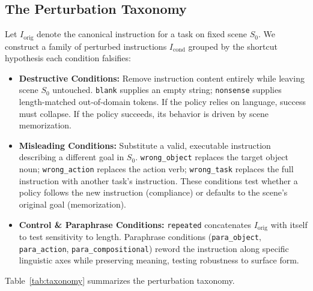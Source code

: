 \documentclass[11pt]{article}
\begin{document}
\subsection{The Perturbation Taxonomy}
\label{subsec:taxonomy}

Let $I_{\text{orig}}$ denote the canonical instruction for a task on fixed scene $S_0$. We construct a family of perturbed instructions $I_{\text{cond}}$ grouped by the shortcut hypothesis each condition falsifies:

\begin{itemize}
    \item \textbf{Destructive Conditions:} Remove instruction content entirely while leaving scene $S_0$ untouched. \texttt{blank} supplies an empty string; \texttt{nonsense} supplies length-matched out-of-domain tokens. If the policy relies on language, success must collapse. If the policy succeeds, its behavior is driven by scene memorization.
    \item \textbf{Misleading Conditions:} Substitute a valid, executable instruction describing a different goal in $S_0$. \texttt{wrong\_object} replaces the target object noun; \texttt{wrong\_action} replaces the action verb; \texttt{wrong\_task} replaces the full instruction with another task's instruction. These conditions test whether a policy follows the new instruction (compliance) or defaults to the scene's original goal (memorization).
    \item \textbf{Control \& Paraphrase Conditions:} \texttt{repeated} concatenates $I_{\text{orig}}$ with itself to test sensitivity to length. Paraphrase conditions (\texttt{para\_object}, \texttt{para\_action}, \texttt{para\_compositional}) reword the instruction along specific linguistic axes while preserving meaning, testing robustness to surface form.
\end{itemize}

Table~\ref{tab:taxonomy} summarizes the perturbation taxonomy.
\end{document}
